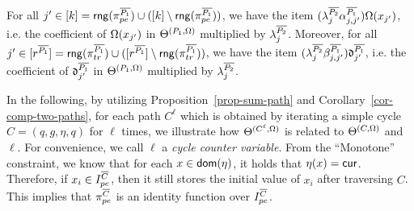 For all $j'\in [k] =\mathsf{rng}(\pi^{\overline{P_1}}_{pe}) \cup ([k] \setminus \mathsf{rng}(\pi^{\overline{P_1}}_{pe}))$, we have the item $(\lambda^{\overline{P_2}}_{j} \alpha^{\overline{P_1}}_{j,j'}) \Omega(x_{j'})$, i.e. the coefficient of $\Omega(x_{j'})$ in $\Theta^{(P_1, \Omega)}$ multiplied by $\lambda^{\overline{P_2}}_{j}$. Moreover, for all $j'\in [r^{\overline{P_1}}] = \mathsf{rng}(\pi^{\overline{P_1}}_{tr}) \cup ([r^{\overline{P_1}}] \setminus \mathsf{rng}(\pi^{\overline{P_1}}_{tr}))$, we have 
the item $( \lambda^{\overline{P_2}}_{j} \beta^{\overline{P_1}}_{j,j'}) \mathfrak{d}^{\overline{P_1}}_{j'}$, i.e. the coefficient of $\mathfrak{d}^{\overline{P_1}}_{j'}$ in $\Theta^{(P_1, \Omega)}$ multiplied by $\lambda^{\overline{P_2}}_{j}$.

In the following, by utilizing Proposition~\ref{prop-sum-path} and Corollary~\ref{cor-comp-two-paths}, for each path $C^{\ell}$ which is obtained by iterating a simple cycle $C = (q, g, \eta, q)$ for $\ell$ times, we illustrate how $\Theta^{(C^\ell,\Omega)}$ is related to $\Theta^{(C, \Omega)}$ and $\ell$. For convenience, we call $\ell$ a \emph{cycle counter variable}. From the ``Monotone'' constraint, we know that for each $x \in \mathsf{dom}(\eta)$, it holds that $\eta(x)=\mathsf{cur}$. Therefore, if $x_i \in I^{\overline{C}}_{pe}$, then it still stores the initial value of $x_i$ after traversing $C$. This implies that $\pi^{\overline{C}}_{pe}$ is an identity function over $I^{\overline{C}}_{pe}$.

